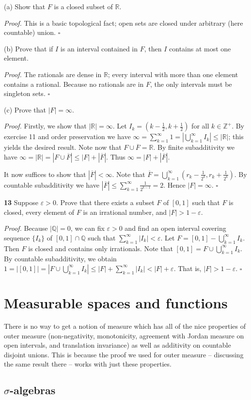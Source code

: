\documentclass[a4paper]{article}
\newcommand{\R}{\mathbb{R}}
\newcommand{\Q}{\mathbb{Q}}
\newcommand{\Z}{\mathbb{Z}}
\begin{document}
(a) Show that $F$ is a closed subset of $\R$.

\emph{Proof.} This is a basic topological fact; open sets are closed under arbitrary (here countable) union. $\square$

(b) Prove that if $I$ is an interval contained in $F$, then $I$ contains at most one element.

\emph{Proof.} The rationals are dense in $\R$; every interval with more than one element contains a rational. Because no rationals are in $F$, the only intervals must be singleton sets. $\square$

(c) Prove that $|F| = \infty$.

\emph{Proof.} Firstly, we show that $|\R| = \infty$. Let $I_k = \left(k - \frac12, k + \frac12\right)$ for all $k \in \Z^+$. By exercise 11 and order preservation we have $\infty = \sum_{k=1}^\infty 1 = \left|\bigcup_{k=1}^\infty I_k\right| \leq |\R|$; this yields the desired result. Note now that $F \cup \overline{F} = \R$. By finite subadditivity we have $\infty = |\R| = |F \cup \overline{F}| \leq |F| + |\overline{F}|$. Thus $\infty = |F| + |\overline{F}|$.

It now suffices to show that $|\overline{F}| < \infty$. Note that $\overline{F} = \bigcup_{k=1}^\infty \left(r_k - \frac{1}{2^k}, r_k + \frac{1}{2^k}\right)$. By countable subadditivity we have $|\overline{F}| \leq \sum_{k=1}^\infty \frac{1}{2^{k-1}} = 2$. Hence $|F| = \infty$. $\square$

\textbf{13} Suppose $\varepsilon > 0$. Prove that there exists a subset $F$ of $[0, 1]$ such that $F$ is closed, every element of $F$ is an irrational number, and $|F| > 1 - \varepsilon$.

\emph{Proof.} Because $|\Q| = 0$, we can fix $\varepsilon > 0$ and find an open interval covering sequence $\{I_k\}$ of $[0, 1] \cap \Q$ such that $\sum_{k=1}^\infty |I_k| < \varepsilon$. Let $F = [0, 1] - \bigcup_{k=1}^\infty I_k$. Then $F$ is closed and contains only irrationals. Note that $[0, 1] = F \cup \bigcup_{k=1}^\infty I_k$. By countable subadditivity, we obtain $1 = |[0, 1]| = \left|F \cup \bigcup_{k=1}^\infty I_k\right| \leq |F| + \sum_{k=1}^\infty |I_k| < |F| + \varepsilon$. That is, $|F| > 1 - \varepsilon$. $\square$

\section{Measurable spaces and functions}

There is no way to get a notion of measure which has all of the nice properties of outer measure (non-negativity, monotonicity, agreement with Jordan measure on open intervals, and translation invariance) as well as additivity on countable disjoint unions. This is because the proof we used for outer measure -- discussing the same result there -- works with just these properties.

\subsection{$\sigma$-algebras}
\end{document}
